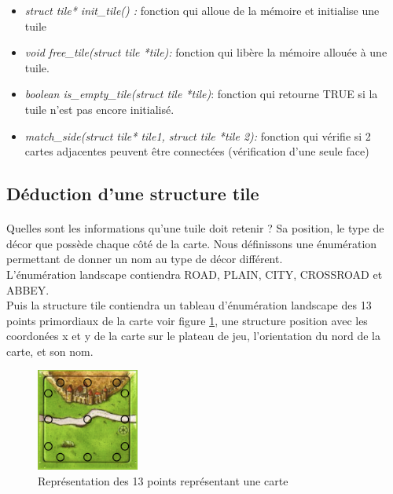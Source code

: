 \documentclass[12pt]{article}
\begin{document}
\begin{itemize}
\item \textit{struct tile* init\_tile() :} fonction qui alloue de la mémoire et initialise une tuile\\
\item \textit{void free\_tile(struct tile *tile):} fonction qui libère la mémoire allouée à une tuile.\\
\item \textit{
boolean is\_empty\_tile(struct tile *tile)}: fonction qui retourne TRUE si la tuile n'est pas encore initialisé.\\
\item \textit{match\_side(struct tile* tile1, struct tile *tile 2):} fonction qui vérifie si 2 cartes adjacentes peuvent être connectées (vérification d'une seule face)
\end{itemize}

\subsection{Déduction d'une structure tile}

\paragraph{} Quelles sont les informations qu'une tuile doit retenir ? Sa position, le type de décor que possède chaque côté de la carte. Nous définissons une énumération permettant de donner un nom au type de décor différent.\\

L'énumération landscape contiendra ROAD, PLAIN, CITY, CROSSROAD et ABBEY.\\
Puis la structure tile contiendra un tableau d'énumération landscape des 13 points primordiaux de la carte voir figure \ref{a}, une structure position avec les coordonées x et y de la carte sur le plateau de jeu, l'orientation du nord de la carte, et son nom.

\begin{figure}[!h]
\begin{center}
\includegraphics[width=0.3\textwidth]{carte1.png}
\end{center}
\caption{Représentation des 13 points représentant une carte} \label{a}
\end{figure}
\end{document}
